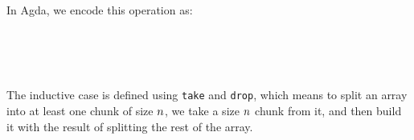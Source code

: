 \documentclass{l4proj}
\begin{document}
In Agda, we encode this operation as:
\begin{code}%
\>[0]\<%
\\
\>[0]\AgdaSpace{}%
\AgdaSymbol{:}\AgdaSpace{}%
\AgdaSymbol{(}\AgdaSpace{}%
\AgdaSymbol{:}\AgdaSpace{}%
\AgdaSymbol{)}\AgdaSpace{}%
\AgdaSpace{}%
\AgdaSymbol{\{}\AgdaSpace{}%
\AgdaSymbol{:}\AgdaSpace{}%
\AgdaSymbol{\}}\AgdaSpace{}%
\AgdaSpace{}%
\AgdaSymbol{\{}\AgdaSpace{}%
\AgdaSymbol{:}\AgdaSpace{}%
\AgdaSymbol{\}}\AgdaSpace{}%
\AgdaSpace{}%
\AgdaSpace{}%
\AgdaSpace{}%
\AgdaSymbol{(}\AgdaSpace{}%
\AgdaOperator{\AgdaPrimitive{*}}\AgdaSpace{}%
\AgdaSymbol{)}\AgdaSpace{}%
\AgdaSpace{}%
\AgdaSpace{}%
\AgdaSymbol{(}\AgdaSpace{}%
\AgdaSpace{}%
\AgdaSymbol{)}\AgdaSpace{}%
\<%
\\
\>[0]\AgdaSpace{}%
\AgdaSpace{}%
\AgdaSymbol{\{}\AgdaSymbol{\}}\AgdaSpace{}%
\AgdaSpace{}%
\AgdaSymbol{=}\AgdaSpace{}%
\AgdaInductiveConstructor{[]}\<%
\\
\>[0]\AgdaSpace{}%
\AgdaSpace{}%
\AgdaSymbol{\{}\AgdaSpace{}%
\AgdaSymbol{\}}\AgdaSpace{}%
\AgdaSpace{}%
\AgdaSymbol{=}\AgdaSpace{}%
\AgdaSpace{}%
\AgdaSpace{}%
\AgdaSymbol{\{}\AgdaSpace{}%
\AgdaOperator{\AgdaPrimitive{*}}\AgdaSpace{}%
\AgdaSymbol{\}}\AgdaSpace{}%
\AgdaSpace{}%
\AgdaSpace{}%
\AgdaSpace{}%
\AgdaSpace{}%
\AgdaSymbol{(}\AgdaSpace{}%
\AgdaSpace{}%
\AgdaSymbol{)}\<%
\end{code}
The inductive case is defined using \texttt{take} and \texttt{drop}, which means to split an array into at least one chunk of size $n$, we take a size $n$ chunk from it, and then build it with the result of splitting the rest of the array.
\end{document}
